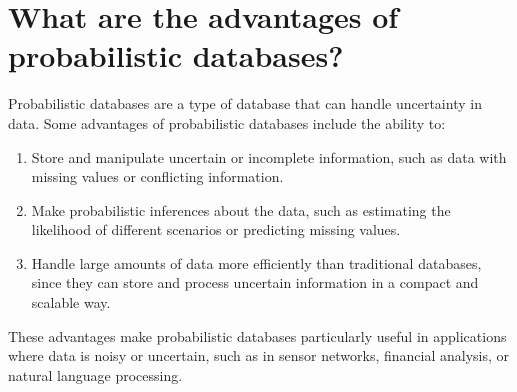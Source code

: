 \chapter{What are the advantages of probabilistic databases?}

Probabilistic databases are a type of database that can handle uncertainty in data. Some advantages of probabilistic databases include the ability to:

\begin{enumerate}
	\item Store and manipulate uncertain or incomplete information, such as data with missing values or conflicting information.
	
	\item Make probabilistic inferences about the data, such as estimating the likelihood of different scenarios or predicting missing values.
	
	\item Handle large amounts of data more efficiently than traditional databases, since they can store and process uncertain information in a compact and scalable way.
	
\end{enumerate}

These advantages make probabilistic databases particularly useful in applications where data is noisy or uncertain, such as in sensor networks, financial analysis, or natural language processing.